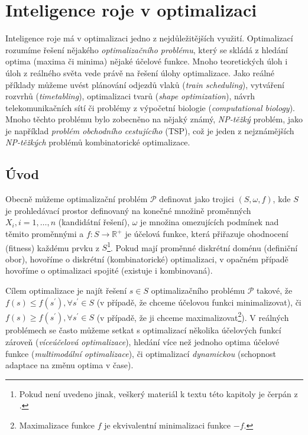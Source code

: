 \documentclass[a4paper,12pt]{article}
\begin{document}
\newpage



\section{Inteligence roje v optimalizaci}
Inteligence roje má v optimalizaci jedno z nejdůležitějších využití.
Optimalizací rozumíme řešení
nějakého {\it optimalizačního problému}, který se skládá z hledání optima (maxima či minima)
nějaké účelové funkce. Mnoho teoretických úloh i úloh z reálného světa vede právě na řešení úlohy
optimalizace. Jako reálné příklady můžeme uvést plánování odjezdů vlaků ({\it train scheduling}),
vytváření rozvrhů ({\it timetabling}), optimalizaci tvarů ({\it shape optimization}), návrh
telekomunikačních sítí či problémy z výpočetní biologie ({\it computational biology}). Mnoho
těchto problému bylo zobecněno na nějaký známý, {\it NP-těžký} problém, jako je například {\it problém
obchodního cestujícího} (TSP), což je jeden z nejznámějších {\it NP-těžkých} problémů kombinatorické
optimalizace. %

\subsection{Úvod}
Obecně můžeme optimalizační problém $\mathcal{P}$ definovat jako trojici $(S,\omega,f)$, kde $S$
je prohledávací prostor definovaný na konečné množině proměnných $X_i,i=1,\dots,n$ (kandidátní řešení),
 $\omega$ je množina omezujících podmínek nad těmito proměnnými a
$f:S\rightarrow\mathbb{R}^{+}$ je účelová funkce, která přiřazuje ohodnocení (fitness) každému prvku %
z $S$\footnote{Pokud není uvedeno jinak, veškerý materiál k textu této kapitoly je čerpán z \cite{Blum08SwarmOpt}.}.
Pokud mají proměnné diskrétní doménu (definiční obor), hovoříme o diskrétní
(kombinatorické) optimalizaci, v opačném případě hovoříme o optimalizaci spojité (existuje i
kombinovaná).

Cílem optimalizace je najít řešení $s\in S$ optimalizačního problému $\mathcal{P}$ takové, že
$f(s)\leq f(s^{\prime}),\forall s^{\prime}\in S$ (v případě, že chceme účelovou funkci
minimalizovat), či $f(s)\geq f(s^{\prime}),\forall s^{\prime}\in S$ (v případě, že ji chceme
maximalizovat\footnote{Maximalizace funkce $f$ je ekvivalentní minimalizaci funkce $-f$.}).
V reálných problémech se často můžeme setkat s optimalizací několika účelových
funkcí zároveň ({\it víceúčelová optimalizace}), hledání více než jednoho optima účelové funkce
({\it multimodální optimalizace}), či optimalizací {\it dynamickou} (schopnost adaptace na změnu
optima v čase). %
\end{document}
